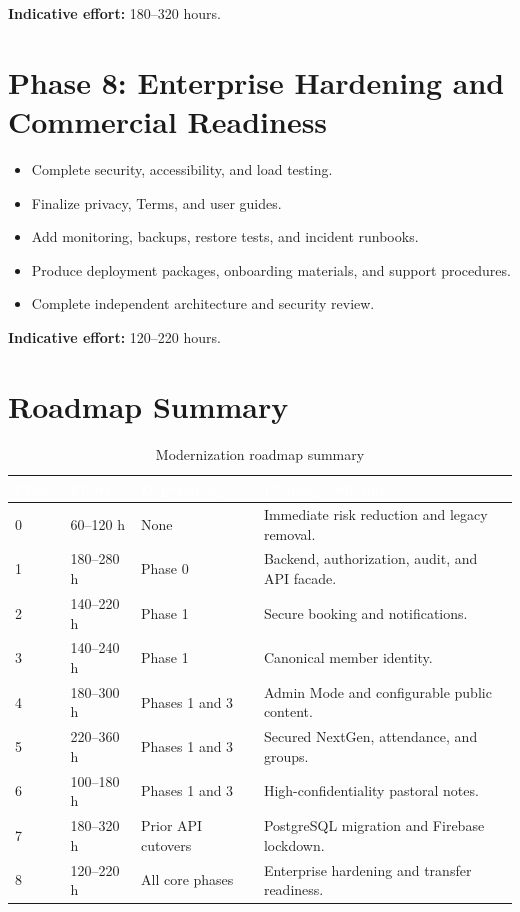 \documentclass[11pt,a4paper,oneside]{report}
\begin{document}
\textbf{Indicative effort:} 180--320 hours.

\section{Phase 8: Enterprise Hardening and Commercial Readiness}

\begin{itemize}
  \item Complete security, accessibility, and load testing.
  \item Finalize privacy, Terms, and user guides.
  \item Add monitoring, backups, restore tests, and incident runbooks.
  \item Produce deployment packages, onboarding materials, and support procedures.
  \item Complete independent architecture and security review.
\end{itemize}

\textbf{Indicative effort:} 120--220 hours.

\section{Roadmap Summary}

\begin{table}[H]
\centering
{}
\begin{tabularx}{\linewidth}{@{}l l l X@{}}
\toprule
\rowcolor{primary}
\textcolor{white}{\textbf{Phase}} & \textcolor{white}{\textbf{Effort}} & \textcolor{white}{\textbf{Dependency}} & \textcolor{white}{\textbf{Primary Outcome}} \\
\midrule
0 & 60--120 h & None & Immediate risk reduction and legacy removal. \\
1 & 180--280 h & Phase 0 & Backend, authorization, audit, and API facade. \\
2 & 140--220 h & Phase 1 & Secure booking and notifications. \\
3 & 140--240 h & Phase 1 & Canonical member identity. \\
4 & 180--300 h & Phases 1 and 3 & Admin Mode and configurable public content. \\
5 & 220--360 h & Phases 1 and 3 & Secured NextGen, attendance, and groups. \\
6 & 100--180 h & Phases 1 and 3 & High-confidentiality pastoral notes. \\
7 & 180--320 h & Prior API cutovers & PostgreSQL migration and Firebase lockdown. \\
8 & 120--220 h & All core phases & Enterprise hardening and transfer readiness. \\
\bottomrule
\end{tabularx}
\caption{Modernization roadmap summary}
\end{table}
\end{document}
